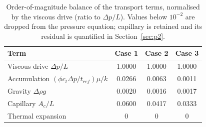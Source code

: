 \begin{table}[htbp]
\centering
\caption{Order-of-magnitude balance of the transport terms, normalised by the viscous drive (ratio to $\Delta p/L$). Values below $10^{-2}$ are dropped from the pressure equation; capillary is retained and its residual is quantified in Section~\ref{sec:p2}.}
\label{tab:terms}
\small
\begin{tabular}{@{}lccc@{}}
\toprule
Term & Case 1 & Case 2 & Case 3 \\
\midrule
Viscous drive $\Delta p/L$ & 1.0000 & 1.0000 & 1.0000 \\
Accumulation $(\phi c_t\Delta p/t_{ref})\mu/k$ & 0.0266 & 0.0063 & 0.0011 \\
Gravity $\Delta\rho g$ & 0.0020 & 0.0016 & 0.0017 \\
Capillary $A_c/L$ & 0.0600 & 0.0417 & 0.0333 \\
Thermal expansion & 0 & 0 & 0 \\
\bottomrule
\end{tabular}
\end{table}

